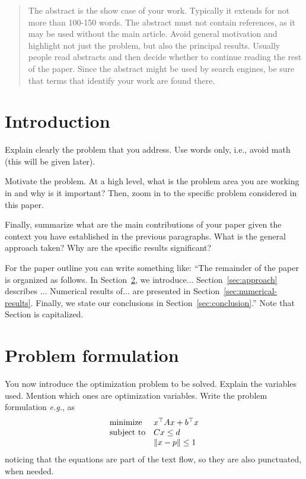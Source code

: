 \documentclass[a4paper]{IEEEtran}
\begin{document}
\maketitle

\begin{abstract}
  The abstract is the show case of your work. Typically it extends for
  not more than 100-150 words.
  The abstract must not contain references, as it may be used without
  the main article. Avoid general motivation and highlight not just
  the problem, but also the principal results. Usually people read
  abstracts and then decide whether to continue reading the rest of the
  paper. Since the abstract might be used by search engines, be sure
  that terms that identify your work are found there.

\end{abstract}

\section{Introduction}
\label{sec:introduction}
Explain clearly the problem that you address. Use words only, i.e., 
avoid math (this will be given later).

Motivate the problem. At a high level, what is the problem
area you are working in and why is it important? Then, zoom in to the
specific problem considered in this paper.

Finally, summarize what are the main contributions of your paper given
the context you have established in the previous paragraphs. What is
the general approach taken? Why are the specific results significant?


For the paper outline you can write something like: ``The remainder of
the paper is organized as follows. In
Section~\ref{sec:problem-formulation}, we
introduce... Section~\ref{sec:approach} describes ... Numerical
results of... are presented in
Section~\ref{sec:numerical-results}. Finally, we state our conclusions
in Section~\ref{sec:conclusion}.'' Note that Section is capitalized.

\section{Problem formulation}
\label{sec:problem-formulation}

You now introduce the optimization problem to be solved. Explain the
variables used. Mention which ones are optimization variables. Write
the problem formulation \textit{e.g.}, as
\begin{equation}
  \label{eq:problem}
\begin{array}[t]{ll} \text{minimize} & x^\top A x + b^\top x \\
\text{subject to} & C x \leq d \\ & \left\| x - p \right\| \leq 1 \end{array}
\end{equation}
noticing that the equations are part of the text flow, so they are also
punctuated, when needed.
\end{document}
